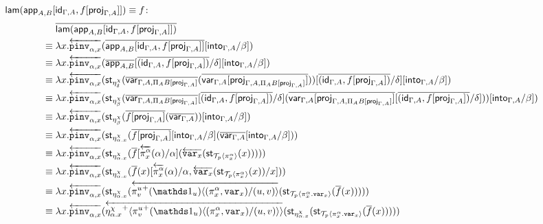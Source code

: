 \documentclass[10pt]{article}
\theoremstyle{definition}
\newcommand{\id}{\mathsf{id}}
\newcommand{\rewrite}[2]{\overleftarrow{#1}(#2)}
\newcommand\UI[2]{\ensuremath{\lambda #1.#2}}
\newcommand\StI[2]{\ensuremath{\mathsf{st}_{#1}(#2)}}
\newcommand\TrPlus[2]{\ensuremath{{#1}^+(#2)}}
\newcommand\ApEl[2]{\mathcal{T}_{#1}\langle#2\rangle}
\newcommand\bdot[0]{\mathbin{.}}
\newcommand\ap[2]{\ensuremath{#1 \langle #2 \rangle }}
\newcommand\ApPlus[2]{\ensuremath{{#1}^+ \langle #2 \rangle }}
\begin{document}
\begin{enumerate}[style = multiline, labelwidth = 80pt]
\item[{$\qlam(\qapp{A,B}[\id_{\Gamma, A}, f[\proj{\Gamma, A}]]) \equiv f$}:] \begin{align*}
&\upstairs{\qlam(\qapp{A,B}[\id_{\Gamma, A}, f[\proj{\Gamma, A}]])} \\
\equiv{} &\UI{x}{\rewrite{\pinv{\alpha,x}}{\upstairs{\qapp{A,B}[\id_{\Gamma, A}, f[\proj{\Gamma, A}]]}[\into{\Gamma, A}/\beta]}} \\
\equiv{} &\UI{x}{\rewrite{\pinv{\alpha,x}}{\upstairs{\qapp{A,B}}[\upstairs{(\id_{\Gamma, A}, f[\proj{\Gamma, A}])}/\delta][\into{\Gamma, A}/\beta]}} \\
\equiv{} &\UI{x}{\rewrite{\pinv{\alpha,x}}{\StI{\eta^\chi_\delta}{\upstairs{\qvar{\Gamma, A, \Pi_A B[\proj{\Gamma, A}]}}(\upstairs{\qvar{\Gamma, A}[\proj{\Gamma, A, \Pi_A B[\proj{\Gamma, A}]}]})}[\upstairs{(\id_{\Gamma, A}, f[\proj{\Gamma, A}])}/\delta][\into{\Gamma, A}/\beta]}} \\
\equiv{} &\UI{x}{\rewrite{\pinv{\alpha,x}}{\StI{\eta^\chi_\beta}{\upstairs{\qvar{\Gamma, A, \Pi_A B[\proj{\Gamma, A}]}}[\upstairs{(\id_{\Gamma, A}, f[\proj{\Gamma, A}])}/\delta](\upstairs{\qvar{\Gamma, A}[\proj{\Gamma, A, \Pi_A B[\proj{\Gamma, A}]}]}[\upstairs{(\id_{\Gamma, A}, f[\proj{\Gamma, A}])}/\delta])}[\into{\Gamma, A}/\beta]}} \\
\equiv{} &\UI{x}{\rewrite{\pinv{\alpha,x}}{\StI{\eta^\chi_\beta}{\upstairs{f[\proj{\Gamma, A}]}(\upstairs{\qvar{\Gamma, A}})}[\into{\Gamma, A}/\beta]} \\
\equiv{} &\UI{x}{\rewrite{\pinv{\alpha,x}}{\StI{\eta^\chi_{\alpha.x}}{\upstairs{f[\proj{\Gamma, A}]}[\into{\Gamma, A}/\beta](\upstairs{\qvar{\Gamma, A}}[\into{\Gamma, A}/\beta]}}}} \\
\equiv{} &\UI{x}{\rewrite{\pinv{\alpha,x}}{\StI{\eta^\chi_{\alpha.x}}{\upstairs{f}[\rewrite{\pi^\alpha_x}{\alpha}/\alpha](\rewrite{\var{x}}{\StI{\ApEl{p}{\pi^{\alpha}_x}}{x}})}}} \\
\equiv{} &\UI{x}{\rewrite{\pinv{\alpha,x}}{\StI{\eta^\chi_{\alpha.x}}{\upstairs{f}(x)[\rewrite{\pi^\alpha_x}{\alpha}/\alpha,\rewrite{\var{x}}{\StI{\ApEl{p}{\pi^{\alpha}_x}}{x}}/x]}}} \\
\equiv{} &\UI{x}{\rewrite{\pinv{\alpha,x}}{\StI{\eta^\chi_{\alpha.x}}{\rewrite{\ap{\TrPlus{\pi^u_v}{\One_u}}{(\pi^\alpha_x,\var{x})/(u,v)}}{\StI{\ApEl{p}{\pi^\alpha_x \bdot \var{x}}}{\upstairs{f}(x)}}}}} \\
\equiv{} &\UI{x}{\rewrite{\pinv{\alpha,x}}{\rewrite{\ApPlus{\eta^\chi_{\alpha.x}}{\ap{\TrPlus{\pi^u_v}{\One_u}}{(\pi^\alpha_x,\var{x})/(u,v)}}}{\StI{\eta^\chi_{\alpha.x}}{\StI{\ApEl{p}{\pi^\alpha_x \bdot \var{x}}}{\upstairs{f}(x)}}}}} \\

\end{align*}
\end{enumerate}
\end{document}
